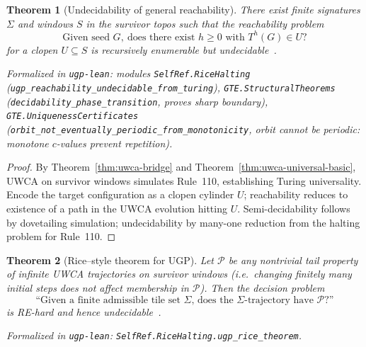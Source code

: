 \documentclass[12pt]{article}
\newtheorem{theorem}{Theorem}[section]
\numberwithin{equation}{section}
\begin{document}
\begin{theorem}[Undecidability of general reachability]\label{thm:j35-undec}
There exist finite signatures $\Sigma$ and windows $S$ in the survivor topos such that the reachability problem
\[
\text{Given seed }G,\ \text{does there exist }h\ge 0\text{ with }T^{h}(G)\in U?
\]
for a clopen $U\subseteq S$ is recursively enumerable but undecidable~\cite{SpivackUGPFormalization,ugp-lean}.

\noindent\emph{Formalized in \texttt{ugp-lean}}:
modules \texttt{SelfRef.RiceHalting} (\texttt{ugp\_reachability\_undecidable\_from\_turing}),
\texttt{GTE.StructuralTheorems} (\texttt{decidability\_phase\_transition}, proves sharp boundary),
\texttt{GTE.UniquenessCertificates} (\texttt{orbit\_not\_eventually\_periodic\_from\_monotonicity},
orbit cannot be periodic: monotone $c$-values prevent repetition).
\end{theorem}
\begin{proof}
By Theorem~\ref{thm:uwca-bridge} and Theorem~\ref{thm:uwca-universal-basic}, UWCA on survivor windows simulates Rule~110,
establishing Turing universality. Encode the target configuration as a clopen cylinder $U$; reachability reduces to existence of a path in the UWCA evolution hitting $U$. Semi-decidability follows by dovetailing simulation; undecidability by many-one reduction from the halting problem for Rule~110.
\end{proof}

\begin{theorem}[Rice--style theorem for UGP]\label{thm:rice-ugp}
Let $\mathcal{P}$ be any nontrivial \emph{tail} property of infinite UWCA trajectories on survivor windows (i.e.\ changing finitely many initial steps does not affect membership in $\mathcal{P}$). Then the decision problem
\[
\text{``Given a finite admissible tile set $\Sigma$, does the $\Sigma$-trajectory have $\mathcal{P}$?''}
\]
is RE-hard and hence undecidable~\cite{SpivackUGPFormalization,ugp-lean}.

\noindent\emph{Formalized in} \texttt{ugp-lean}: \texttt{SelfRef.RiceHalting.ugp\_rice\_theorem}.
\end{theorem}
\end{document}
